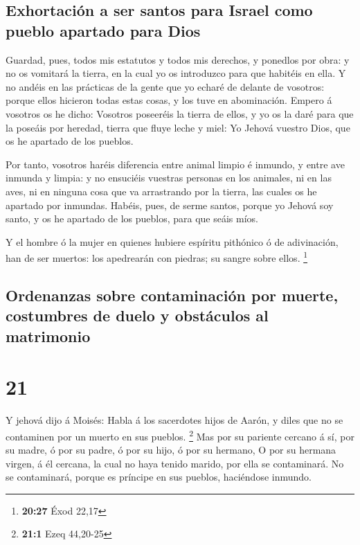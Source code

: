 \hypertarget{exhortaciuxf3n-a-ser-santos-para-israel-como-pueblo-apartado-para-dios}{%
\subsection{Exhortación a ser santos para Israel como pueblo apartado
para
Dios}\label{exhortaciuxf3n-a-ser-santos-para-israel-como-pueblo-apartado-para-dios}}

 Guardad, pues, todos mis estatutos y todos mis derechos, y
ponedlos por obra: y no os vomitará la tierra, en la cual yo os
introduzco para que habitéis en ella.  Y no andéis en las
prácticas de la gente que yo echaré de delante de vosotros: porque ellos
hicieron todas estas cosas, y los tuve en abominación. 
Empero á vosotros os he dicho: Vosotros poseeréis la tierra de ellos, y
yo os la daré para que la poseáis por heredad, tierra que fluye leche y
miel: Yo Jehová vuestro Dios, que os he apartado de los pueblos.

 Por tanto, vosotros haréis diferencia entre animal limpio
é inmundo, y entre ave inmunda y limpia: y no ensuciéis vuestras
personas en los animales, ni en las aves, ni en ninguna cosa que va
arrastrando por la tierra, las cuales os he apartado por inmundas.
 Habéis, pues, de serme santos, porque yo Jehová soy santo,
y os he apartado de los pueblos, para que seáis míos.

 Y el hombre ó la mujer en quienes hubiere espíritu
pithónico ó de adivinación, han de ser muertos: los apedrearán con
piedras; su sangre sobre ellos. \footnote{\textbf{20:27} Éxod 22,17}

\hypertarget{ordenanzas-sobre-contaminaciuxf3n-por-muerte-costumbres-de-duelo-y-obstuxe1culos-al-matrimonio}{%
\subsection{Ordenanzas sobre contaminación por muerte, costumbres de
duelo y obstáculos al
matrimonio}\label{ordenanzas-sobre-contaminaciuxf3n-por-muerte-costumbres-de-duelo-y-obstuxe1culos-al-matrimonio}}

\hypertarget{section-20}{%
\section{21}\label{section-20}}

 Y jehová dijo á Moisés: Habla á los sacerdotes hijos de
Aarón, y diles que no se contaminen por un muerto en sus pueblos.
\footnote{\textbf{21:1} Ezeq 44,20-25}  Mas por su pariente
cercano á sí, por su madre, ó por su padre, ó por su hijo, ó por su
hermano,  O por su hermana virgen, á él cercana, la cual no
haya tenido marido, por ella se contaminará.  No se
contaminará, porque es príncipe en sus pueblos, haciéndose inmundo.

